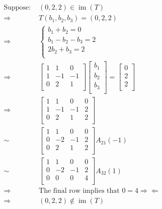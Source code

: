 \documentclass{article}
\DeclareMathOperator{\im}{im}
\begin{document}
\begin{equation*}
    \begin{split}
        \text{Suppose: }&(0,2,2)\in\im(T)\\
        \Rightarrow&T(b_1,b_2,b_3)=(0,2,2)\\
        \Rightarrow&\begin{cases}
            b_1+b_2=0\\
            b_1-b_2-b_3=2\\
            2b_2+b_3=2\\
        \end{cases}\\
        \Rightarrow&\begin{bmatrix}
            1&1&0\\
            1&-1&-1\\
            0&2&1\\
        \end{bmatrix}\begin{bmatrix}
            b_1\\
            b_2\\
            b_3\\
        \end{bmatrix}=\begin{bmatrix}
            0\\
            2\\
            2\\
        \end{bmatrix}\\
        \Rightarrow&\left[\begin{array}{ccc|c}
            1&1&0&0\\
            1&-1&-1&2\\
            0&2&1&2\\
        \end{array}\right]\\
        \sim&\left[\begin{array}{ccc|c}
            1&1&0&0\\
            0&-2&-1&2\\
            0&2&1&2\\
        \end{array}\right]A_{21}(-1)\\
        \sim&\left[\begin{array}{ccc|c}
            1&1&0&0\\
            0&-2&-1&2\\
            0&0&0&4\\
        \end{array}\right]A_{32}(1)\\
        \Rightarrow&\text{The final row implies that }0=4\Rightarrow\!\Leftarrow\\
        \Rightarrow&(0,2,2)\notin\im(T)\\
    \end{split}
\end{equation*}
\end{document}

